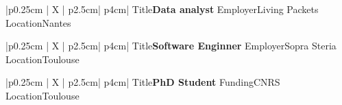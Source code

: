 %
%
\iftrue %
\begin{myTableEnv}{|p{0.25cm} | X | p{2.5cm}| p{4cm}|}%
    \myRow
        {Title}{\bfseries Data analyst} %
        {Employer}{Living Packets} %
    \myRow
        {}{}%
        {Location}{Nantes}%
\end{myTableEnv}%
%
%
\myTablesSeparator
%
%
\fi
%
%
\iftrue %
\begin{myTableEnv}{|p{0.25cm} | X | p{2.5cm}| p{4cm}|}%
    \myRow
        {Title}{\bfseries Software Enginner} %
        {Employer}{Sopra Steria} %
    \myRow
        {}{}%
        {Location}{Toulouse}%
\end{myTableEnv}%
%
%
\myTablesSeparator
%
%
\fi
%
%
\iftrue %
\begin{myTableEnv}{|p{0.25cm} | X | p{2.5cm}| p{4cm}|}%
    \myRow
        {Title}{\bfseries PhD Student} %
        {Funding}{CNRS} %
    \myRow
        {}{}%
        {Location}{Toulouse}%
\end{myTableEnv}%
%
%
\myTablesSeparator
%
%
\fi
%
%